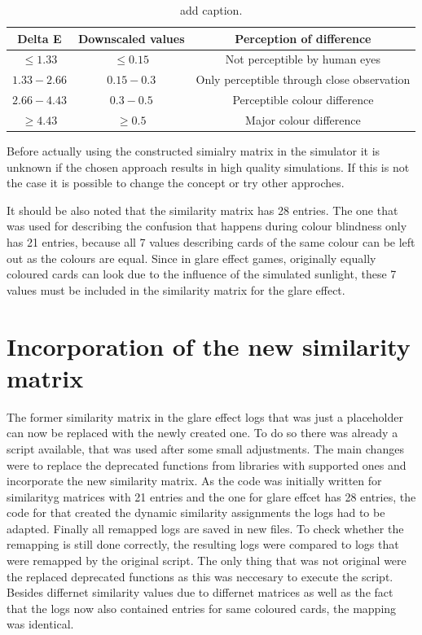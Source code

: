 \begin{table}[H]
	\centering
	\caption{add caption.}
	\label{tab:percept}
	\begin{tabular}{|c|c|c|}
		\hline
		Delta E & Downscaled values & Perception of difference \\
		\hline
		$\leq1.33$ & $\leq0.15$ & Not perceptible by human eyes\\
		$1.33-2.66$ &$0.15-0.3$  & Only perceptible through close observation \\
		$2.66-4.43$ & $0.3-0.5$ & Perceptible colour difference \\
		$\geq4.43$ &$\geq0.5$  & Major colour difference\\
		\hline
	\end{tabular}
\end{table}
Before actually using the constructed simialry matrix in the simulator it is unknown if the chosen approach results in high quality simulations. If this is not the case it is possible to change the concept or try other approches. 

It should be also noted that the similarity matrix has 28 entries. The one that was used for describing the confusion that happens during colour blindness only has 21 entries, because all 7 values describing cards of the same colour can be left out as the colours are equal. Since in glare effect games, originally equally coloured cards can look due to the influence of the simulated sunlight, these 7 values must be included in the similarity matrix for the glare effect.

\section{Incorporation of the new similarity matrix}
\label{incorporation_of_the_new_similarity_matrix}
The former similarity matrix in the glare effect logs that was just a placeholder can now be replaced with the newly created one. To do so there was already a script available, that was used after some small adjustments. The main changes were to replace the deprecated functions from libraries with supported ones and incorporate the new similarity matrix. As the code was initially written for similarityg matrices with 21 entries and the one for glare effcet has 28 entries, the code for that created the dynamic similarity assignments the logs had to be adapted. Finally all remapped logs are saved in new files. To check whether the remapping is still done correctly, the resulting logs were compared to logs that were remapped by the original script. The only thing that was not original were the replaced deprecated functions as this was neccesary to execute the script. Besides differnet similarity values due to differnet matrices as well as the fact that the logs now also contained entries for same coloured cards, the mapping was identical. 

